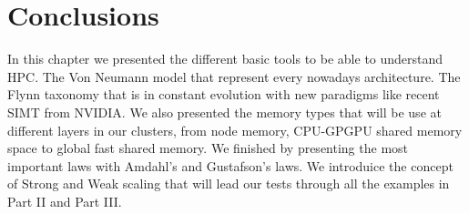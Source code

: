 \section{Conclusions}

In this chapter we presented the different basic tools to be able to understand HPC. 
The Von Neumann model that represent every nowadays architecture. 
The Flynn taxonomy that is in constant evolution with new paradigms like recent SIMT from NVIDIA. 
We also presented the memory types that will be use at different layers in our clusters, from node memory, CPU-GPGPU shared memory space to global fast shared memory. 
We finished by presenting the most important laws with Amdahl's and Gustafson's laws.
We introduice the concept of Strong and Weak scaling that will lead our tests through all the examples in Part II and Part III. 
